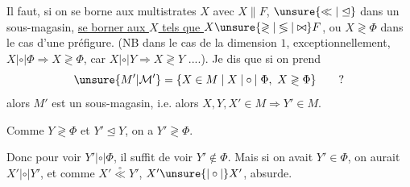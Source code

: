 Il faut, si on se borne aux multistrates $X$ avec $X\parallel F$,  $\unsure{\ll|\trianglelefteq}$ dans un sous-magasin, \uline{se borner aux $X$ tels que $X\unsure{\gtrless|\lessgtr|\bowtie}F$}, ou $X\gtrless\Phi$ dans le cas d'une préfigure. (NB dans le cas de la dimension $1$, exceptionnellement, $X\mathrel{|\circ|}\Phi\Longrightarrow X\gtrless\Phi$, car $X\mathrel{|\circ|}Y\Longrightarrow X\gtrless Y$ ....). Je dis que si on prend
\[
\unsure{M'|\mathcal M'}=\{X\in M\mid X\mathrel{|\circ|}\Phi,\ X\gtrless\Phi\}\qquad ?
\]
alors $M'$ est un sous-magasin, i.e.
alors $X,Y,X'\in M\Longrightarrow Y'\in M$.

Comme $Y\gtrless\Phi$ et $Y'\trianglelefteq Y$, on a $Y'\gtrless\Phi$.

Donc pour voir $Y'\mathrel{|\circ|}\Phi$, il suffit de voir $Y'\notin\Phi$. Mais si on avait $Y'\in\Phi$, on aurait $X'\mathrel{|\circ|}Y'$, et comme $X'\overset{\circ}{\ll}Y'$, $X'\unsure{\mathrel{|\circ|}}X'$, absurde.

